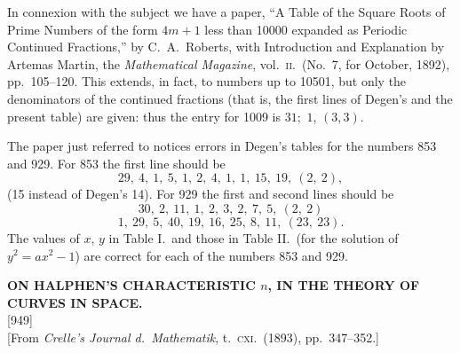 \documentclass[11pt]{article}
\newcommand{\paper}[3]{%
  \clearpage
  \begin{center}
    {\large\bfseries #2}\\[0.5em]
    {\small [#1]}\\[0.3em]
    {\small #3}
  \end{center}
  \vspace{0.5em}
}
\begin{document}
\bigskip\noindent
In connexion with the subject we have a paper, ``A Table of the Square Roots of Prime Numbers of the form $4m+1$ less than 10000 expanded as Periodic Continued Fractions,'' by C.\ A.\ Roberts, with Introduction and Explanation by Artemas Martin, the \textit{Mathematical Magazine}, vol.\ \textsc{ii}.\ (No.\ 7, for October, 1892), pp.\ 105--120.  This extends, in fact, to numbers up to 10501, but only the denominators of the continued fractions (that is, the first lines of Degen's and the present table) are given: thus the entry for 1009 is $31$;\, $1$, $(3, 3)$.

\medskip\noindent
The paper just referred to notices errors in Degen's tables for the numbers 853 and 929.  For 853 the first line should be
\[
29,\ 4,\ 1,\ 5,\ 1,\ 2,\ 4,\ 1,\ 1,\ 15,\ 19,\ (2,\ 2),
\]
(15 instead of Degen's 14).  For 929 the first and second lines should be
\[
30,\ 2,\ 11,\ 1,\ 2,\ 3,\ 2,\ 7,\ 5,\ (2,\ 2)
\]
\[
1,\ 29,\ 5,\ 40,\ 19,\ 16,\ 25,\ 8,\ 11,\ (23,\ 23).
\]
The values of $x$, $y$ in Table I.\ and those in Table II.\ (for the solution of $y^{2}=ax^{2}-1$) are correct for each of the numbers 853 and 929.

\paper{949}{ON HALPHEN'S CHARACTERISTIC $n$, IN THE THEORY OF CURVES IN SPACE.}{[From \textit{Crelle's Journal d.\ Mathematik}, t.\ \textsc{cxi}.\ (1893), pp.\ 347--352.]}
\end{document}
